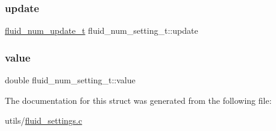\mbox{\label{structfluid__num__setting__t_aa969dac4f43e53e5ed4ebc0fbc76c0c3}} 
\subsubsection{\texorpdfstring{update}{update}}
{\footnotesize\ttfamily \hyperlink{fluid__settings_8h_a90013b793275a87dc2715782e4e80c6d}{fluid\+\_\+num\+\_\+update\+\_\+t} fluid\+\_\+num\+\_\+setting\+\_\+t\+::update}

\mbox{\label{structfluid__num__setting__t_a8ada285150ef8bf54c90c1c6a81b439c}} 
\subsubsection{\texorpdfstring{value}{value}}
{\footnotesize\ttfamily double fluid\+\_\+num\+\_\+setting\+\_\+t\+::value}



The documentation for this struct was generated from the following file\+:\begin{DoxyCompactItemize}
\item 
utils/\hyperlink{fluid__settings_8c}{fluid\+\_\+settings.\+c}\end{DoxyCompactItemize}
